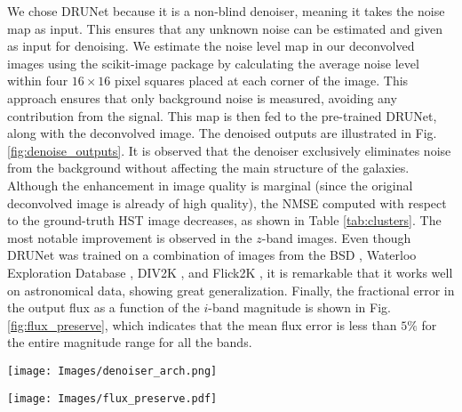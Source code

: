 \documentclass[traditabstract]{aa}
\begin{document}
We chose DRUNet because it is a non-blind denoiser, meaning it takes the noise map as input. This ensures that any unknown noise can be estimated and given as input for denoising. We estimate the noise level map in our deconvolved images using the scikit-image package \citep{skimage} by calculating the average noise level within four $16 \times 16$ pixel squares placed at each corner of the image. This approach ensures that only background noise is measured, avoiding any contribution from the signal. This map is then fed to the pre-trained DRUNet, along with the deconvolved image. The denoised outputs are illustrated in Fig. \ref{fig:denoise_outputs}. It is observed that the denoiser exclusively eliminates noise from the background without affecting the main structure of the galaxies. Although the enhancement in image quality is marginal (since the original deconvolved image is already of high quality), the NMSE computed with respect to the ground-truth HST image decreases, as shown in Table \ref{tab:clusters}. The most notable improvement is observed in the $z$-band images. Even though DRUNet was trained on a combination of images from the BSD \citep{bsd}, Waterloo Exploration Database \citep{waterloo}, DIV2K \citep{div2k}, and Flick2K \citep{flick}, it is remarkable that it works well on astronomical data, showing great generalization. Finally, the fractional error in the output flux as a function of the $i$-band magnitude is shown in Fig. \ref{fig:flux_preserve}, which indicates that the mean flux error is less than $5\%$ for the entire magnitude range for all the bands.


\begin{figure*}[h!]
\begin{center}
\texttt{[image: Images/denoiser\_arch.png]}
\end{center}
\caption{\label{fig:flux_preserve} {DRUNet architecture, which incorporates an additional noise level map as input and integrates U-Net \citep{ronnenberger2015unet} with ResNet \citep{resnet}. "SConv" stands for strided convolution, and "TConv" stands for transposed convolution. Image credits: \cite{drunet}.}}\label{fig:drunet}
\end{figure*}

\begin{figure*}[h!]
\begin{center}
\texttt{[image: Images/flux\_preserve.pdf]}
\end{center}
\caption{\label{fig:flux_preserve} {Fractional error in the output flux as a function of the $i$-band magnitude (which is chosen in order to have the same scale on the x-axes). The dots correspond to the individual galaxies, and the gray line is the best-fit line after binning the magnitude values.}}
\end{figure*}
\end{document}
